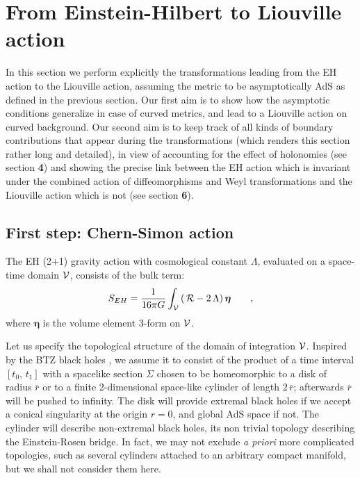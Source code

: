 \documentclass[a4paper,10pt]{article}
\begin{document}
\section{From Einstein-Hilbert to Liouville action} 

In this section we perform explicitly the transformations leading from
the EH action to the Liouville action, assuming the metric to be asymptotically
AdS as defined in the previous section. Our first aim is to show
how the asymptotic conditions generalize in case of curved metrics,
 and lead to a Liouville action on curved background.
Our second aim is to keep track of all kinds of boundary contributions
that appear during the 
transformations (which renders this section rather long and detailed), 
in view of accounting for the effect of holonomies (see section {\bf 4})
and showing the precise link between the
EH action which is invariant under the combined action
of diffeomorphisms and Weyl transformations and the Liouville action 
which is not (see section {\bf 6}). 

\subsection{First step: Chern-Simon action}

The EH (2+1) gravity action with cosmological  
constant $\Lambda$, evaluated on a space-time domain $\cal V$, 
consists of the bulk term: 
\begin{equation} 
\label{SEH} 
S_{EH}=\frac 1 {16 \pi G} \int_{\cal V} \,  
   ( \, { \cal R} - 2 \, \Lambda ) 
       \, \boldsymbol{\eta} 
\qquad ,  
\end{equation} 
where $\boldsymbol{\eta}$ is the volume element 3-form on $\cal V$. 
 
Let us specify the topological structure of the domain of integration $\cal V$. 
Inspired by the BTZ black holes \cite{BTZ}, we assume it to consist 
of the product of a time interval $[t_0,\, t_1]$ with a spacelike 
section $\Sigma$ chosen to be homeomorphic to a disk of radius 
$\bar r$ or to a finite 2-dimensional space-like cylinder of length  
$2 \, \bar r$; afterwards $\bar r$ will be pushed to infinity.  
The disk will provide extremal black 
holes if we accept a conical singularity at the 
origin $r=0$, and global AdS space if not.  
The cylinder will describe  non-extremal black holes, its 
non trivial topology describing 
the Einstein-Rosen bridge. In fact, we may not 
exclude {\it a priori} 
more complicated topologies, such as several cylinders attached to 
an arbitrary compact manifold, but we shall not consider them here. 
 
\end{document}

